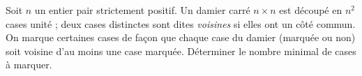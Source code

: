 Soit $n$ un entier pair strictement positif. Un damier carré $n \times n$ est découpé en $n^2$ cases unité ; deux cases distinctes sont dites \emph{voisines} si elles ont un côté commun. On marque certaines cases de façon que chaque case du damier (marquée ou non) soit voisine d'au moins une case marquée. Déterminer le nombre minimal de cases à marquer.

